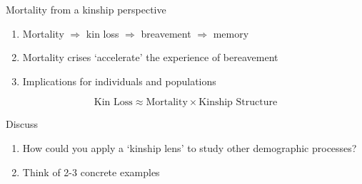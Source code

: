 ﻿\documentclass{beamer}
\begin{document}




\begin{frame}{Mortality from a kinship perspective}
    \begin{enumerate}
        \item Mortality $\Rightarrow$ kin loss $\Rightarrow$ breavement $\Rightarrow$ memory
        \item Mortality crises `accelerate' the experience of bereavement
        \item Implications for individuals and populations
    \end{enumerate}
    
    \begin{equation*}
        \text{Kin Loss} \approx \text{Mortality} \times \text{Kinship Structure}
    \end{equation*}

\end{frame}


\begin{frame}{Discuss}
    \begin{enumerate}
        \item How could you apply a `kinship lens' to study other demographic processes?
        \item Think of 2-3 concrete examples
    \end{enumerate}
\end{frame}


\end{document}
